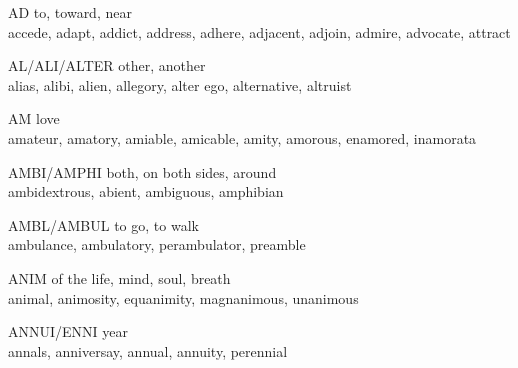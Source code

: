 \begin{flashcard}[Roots]{AD}
to, toward, near\\
\vspace{0.2in}
accede, adapt, addict, address, adhere, adjacent, adjoin, admire, advocate, attract\\
\end{flashcard}

\begin{flashcard}[Roots]{AL/ALI/ALTER}
other, another\\
\vspace{0.2in}
alias, alibi, alien, allegory, alter ego, alternative, altruist\\
\end{flashcard}

\begin{flashcard}[Roots]{AM}
love\\
\vspace{0.2in}
amateur, amatory, amiable, amicable, amity, amorous, enamored, inamorata\\
\end{flashcard}

\begin{flashcard}[Roots]{AMBI/AMPHI}
both, on both sides, around\\
\vspace{0.2in}
 ambidextrous, abient, ambiguous, amphibian\\
\end{flashcard}

\begin{flashcard}[Roots]{AMBL/AMBUL}
to go, to walk\\
\vspace{0.2in}
 ambulance, ambulatory, perambulator, preamble\\
\end{flashcard}

\begin{flashcard}[Roots]{ANIM}
of the life, mind, soul, breath\\
\vspace{0.2in}
animal, animosity, equanimity, magnanimous, unanimous\\
\end{flashcard}

\begin{flashcard}[Roots]{ANNUI/ENNI}
year\\
\vspace{0.2in}
annals, anniversay, annual, annuity, perennial\\
\end{flashcard}

